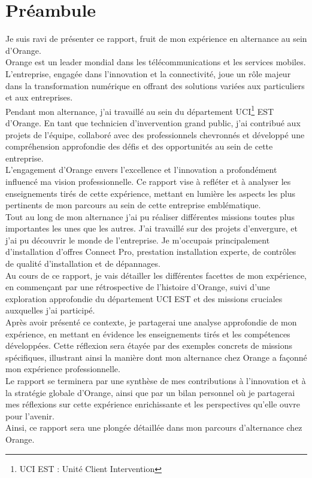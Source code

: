 \documentclass[12pt, a4paper]{article}
\begin{document}
\section{Préambule}
Je suis ravi de présenter ce rapport, fruit de mon expérience en alternance au sein d'Orange.\\

Orange est un leader mondial dans les télécommunications et les services mobiles.
L'entreprise, engagée dans l'innovation et la connectivité, joue un rôle majeur dans la
transformation numérique en offrant des solutions variées aux particuliers et aux entreprises.\\

Pendant mon alternance, j'ai travaillé au sein du département UCI\footnote{\vspace{-1cm}UCI EST : Unité Client Intervention} EST
d'Orange. En tant que technicien d'invervention grand public, j'ai contribué aux projets de l'équipe, collaboré avec des
professionnels chevronnés et développé une compréhension approfondie des défis et des opportunités
au sein de cette entreprise.\\

L'engagement d'Orange envers l'excellence et l'innovation a profondément influencé ma vision
professionnelle. Ce rapport vise à refléter et à analyser les enseignements tirés de cette
expérience, mettant en lumière les aspects les plus pertinents de mon parcours au sein de
cette entreprise emblématique.\\

Tout au long de mon alternance j'ai pu réaliser différentes missions
toutes plus importantes les unes que les autres. J'ai travaillé sur des projets
d'envergure, et j'ai pu découvrir le monde de l'entreprise.
Je m'occupais principalement d'installation d'offres
Connect Pro, prestation installation experte, 
de contrôles de qualité d'installation et de dépannages.\\


Au cours de ce rapport, je vais détailler les différentes facettes de mon expérience,
en commençant par une rétrospective de l'histoire d'Orange, suivi d'une exploration
approfondie du département UCI EST et des missions cruciales auxquelles
j'ai participé.\\
Après avoir présenté ce contexte, je partagerai une analyse approfondie
de mon expérience, en mettant en évidence les enseignements tirés et
les compétences développées. Cette réflexion sera étayée par des exemples
concrets de missions spécifiques, illustrant ainsi la manière dont mon
alternance chez Orange a façonné mon expérience professionnelle.\\
Le rapport se terminera par une synthèse de mes contributions à
l'innovation et à la stratégie globale d'Orange, ainsi que par un
bilan personnel où je partagerai mes réflexions sur cette expérience
enrichissante et les perspectives qu'elle ouvre pour l'avenir.\\
Ainsi, ce rapport sera une plongée détaillée dans mon parcours
d'alternance chez Orange.
\end{document}
